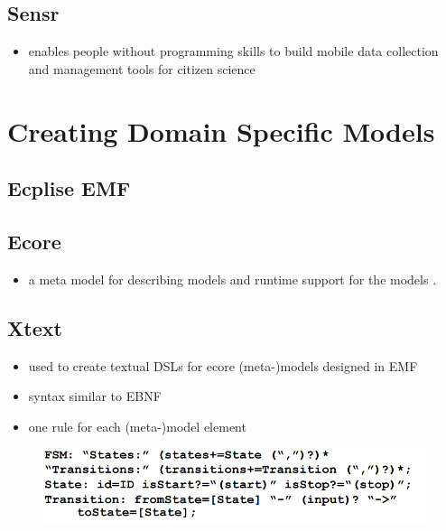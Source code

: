 \documentclass[runningheads,a4paper]{llncs}
\begin{document}
    \subsection{Sensr}
    \begin{itemize}
     \item enables people without programming skills to build mobile data collection and management tools for citizen science
    \end{itemize}

    
    \section{Creating Domain Specific Models}
    
    \subsection{Ecplise EMF}
     \subsection{Ecore}
      \begin{itemize}
	\item  a meta model  for describing models and runtime support for the models .
    \end{itemize}
    
    \subsection{Xtext}
    \begin{itemize}
      \item used to create textual DSLs for ecore (meta-)models designed in EMF
      \item syntax similar to EBNF
      \item one rule for each (meta-)model element
    \end{itemize}
    \begin{figure}[ht]
      \centering
      \includegraphics[width=\textwidth]{images/XTextGrammar.PNG}
    \end{figure}
    
\end{document}
